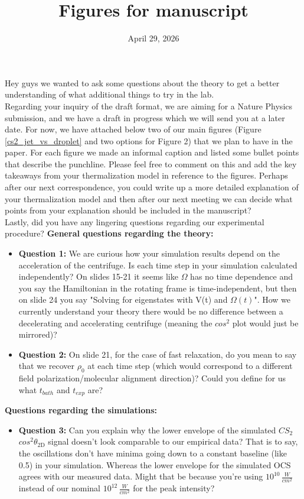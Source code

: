 \documentclass[10pt]{article}
\title{Figures for manuscript}
\date{April 29, 2026}
\author{}
\begin{document}
\noindent
Hey guys we wanted to ask some questions about the theory to get a better understanding of what additional things to try in the lab.\\
\indent Regarding your inquiry of the draft format, we are aiming for a Nature Physics submission, and we have a draft in progress which we will send you at a later date. For now, we have attached below two of our main figures (Figure \ref{cs2_jet_vs_droplet} and two options for Figure 2) that we plan to have in the paper. For each figure we made an informal caption and listed some bullet points that describe the punchline. Please feel free to comment on this and add the key takeaways from your thermalization model in reference to the figures. Perhaps after our next correspondence, you could write up a more detailed explanation of your thermalization model and then after our next meeting we can decide what points from your explanation should be included in the manuscript?\\
\indent Lastly, did you have any lingering questions regarding our experimental procedure?
\newline
\vskip 10pt
\noindent
\textbf{General questions regarding the theory:}
\begin{itemize}
    \item \textbf{Question 1:} We are curious how your simulation results depend on the acceleration of the centrifuge. Is each time step in your simulation calculated independently? On slides 15-21 it seems like $\Omega$ has no time dependence and you say the Hamiltonian in the rotating frame is time-independent, but then on slide 24 you say "Solving for eigenstates with V(t) and $\Omega(t)$". How we currently understand your theory there would be no difference between a decelerating and accelerating centrifuge (meaning the $cos^2$ plot would just be mirrored)? 
    \item \textbf{Question 2:} On slide 21, for the case of fast relaxation, do you mean to say that we recover $\rho_0$ at each time step (which would correspond to a different field polarization/molecular alignment direction)? Could you define for us what $t_{bath}$ and $t_{exp}$ are?
\end{itemize}
\vskip 20pt
\textbf{Questions regarding the simulations:}

\begin{itemize}
    \item \textbf{Question 3:} Can you explain why the lower envelope of the simulated $CS_2$ $cos^2\theta_{\mathrm{2D}}$ signal doesn't look comparable to our empirical data? That is to say, the oscillations don't have minima going down to a constant baseline (like 0.5) in your simulation. Whereas the lower envelope for the simulated OCS agrees with our measured data. Might that be because you're using $10^{10}\, \frac{W}{cm^2}$ instead of our nominal $10^{12}\, \frac{W}{cm^2}$ for the peak intensity? 
\end{itemize}
\end{document}

